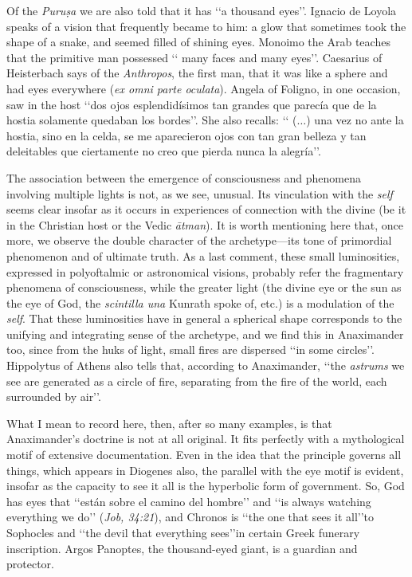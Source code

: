\documentclass[a4paper]{article}
\begin{document}
Of the \textit{Puruṣa} we are also told that it has \lq\lq a thousand
eyes\rq\rq{}. Ignacio de Loyola speaks of a vision that frequently became to
him: a glow that sometimes took the shape of a snake, and seemed filled of
shining eyes. Monoimo the Arab teaches that the primitive man possessed \lq\lq
many faces and many eyes\rq\rq{}. Caesarius of Heisterbach says of the
\textit{Anthropos}, the first man, that it was like a sphere and had eyes
everywhere (\textit{ex omni parte oculata}). Angela of Foligno, in one occasion,
saw in the host \lq\lq dos ojos esplendidísimos tan grandes que parecía que de
la hostia solamente quedaban los bordes\rq\rq{}. She also recalls: \lq\lq
($\ldots$) una vez no ante la hostia, sino en la celda, se me aparecieron ojos
con tan gran belleza y tan deleitables que ciertamente no creo que pierda nunca
la alegría\rq\rq{}.

The association between the emergence of consciousness and phenomena involving
multiple lights is not, as we see, unusual. Its vinculation with the
\textit{self} seems clear insofar as it occurs in experiences of connection with
the divine (be it in the Christian host or the Vedic \textit{ātman}). It is
worth mentioning here that, once more, we observe the double character of the
archetype---its tone of primordial phenomenon and of ultimate truth. As a last
comment, these small luminosities, expressed in polyoftalmic or astronomical
visions, probably refer the fragmentary phenomena of consciousness, while the
greater light (the divine eye or the sun as the eye of God, the
\textit{scintilla una} Kunrath spoke of, etc.) is a modulation of the
\textit{self}. That these luminosities have in general a spherical shape
corresponds to the unifying and integrating sense of the archetype, and we find
this in Anaximander too, since from the huks of light, small fires are dispersed
\lq\lq in some circles\rq\rq{}. Hippolytus of Athens also tells that, according
to Anaximander, \lq\lq the \textit{astrums} we see are generated as a circle of
fire, separating from the fire of the world, each surrounded by air\rq\rq{}.

What I mean to record here, then, after so many examples, is that Anaximander's
doctrine is not at all original. It fits perfectly with a mythological motif of
extensive documentation. Even in the idea that the principle governs all things,
which appears in Diogenes also, the parallel with the eye motif is evident,
insofar as the capacity to see it all is the hyperbolic form of government. So,
God has eyes that \lq\lq están sobre el camino del hombre\rq\rq{} and \lq\lq is
always watching everything we do\rq\rq{} (\textit{Job, 34:21}), and Chronos is
\lq\lq the one that sees it all\rq\rq to Sophocles and \lq\lq the devil that
everything sees\rq\rq in certain Greek funerary inscription. Argos Panoptes, the
thousand-eyed giant, is a guardian and protector.
\end{document}
